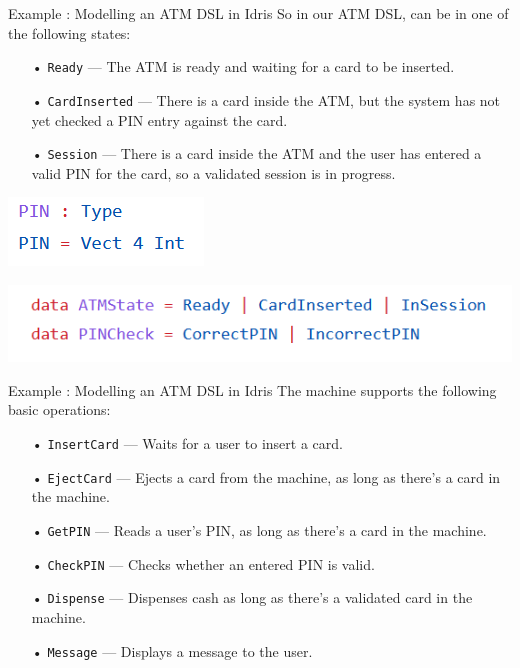 \documentclass{beamer}
\newcommand{\dsltitle}{Example : Modelling an ATM DSL in Idris}
\begin{document}
	\begin{frame}[fragile]{\dsltitle}
		So in our ATM DSL, can be in one of the following states:
		\begin{enumerate}
			\item[•] \texttt{Ready} — The ATM is ready and waiting for a card to be inserted.
			\item[•] \texttt{CardInserted} — There is a card inside the ATM, but the system has not yet checked a PIN entry against the card.
			\item[•] \texttt{Session} — There is a card inside the ATM and the user has entered a valid PIN for the card, so a validated session is in progress.
		\end{enumerate}
		\begin{center}
			\includegraphics[scale=0.7]{pics/dsl-code-0}
		\end{center}
		\begin{center}
			\includegraphics[scale=0.7]{pics/dsl-code-1}
		\end{center}
	\end{frame}
	
	\begin{frame}[fragile]{\dsltitle}
		The machine supports the following basic operations:
		\begin{enumerate}
			\item[•] \texttt{InsertCard} — Waits for a user to insert a card.
			\item[•] \texttt{EjectCard} — Ejects a card from the machine, as long as there’s a card in the machine.
			\item[•] \texttt{GetPIN} — Reads a user’s PIN, as long as there’s a card in the machine.
			\item[•] \texttt{CheckPIN} — Checks whether an entered PIN is valid.
			\item[•] \texttt{Dispense} — Dispenses cash as long as there’s a validated card in the machine.
			\item[•] \texttt{Message} — Displays a message to the user.
		\end{enumerate}
	\end{frame}
	
\end{document}
